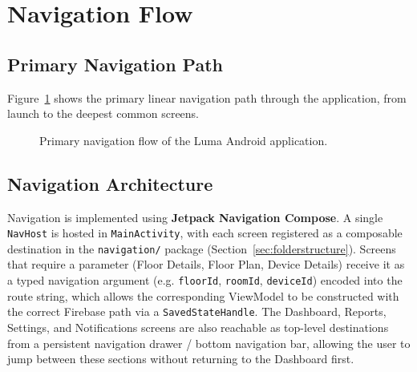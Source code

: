 \documentclass[11pt,a4paper]{article}
\begin{document}
\section{Navigation Flow}
\label{sec:navigation}

\subsection{Primary Navigation Path}
Figure~\ref{fig:nav-flow} shows the primary linear navigation path through the application, from launch to the deepest common screens.

\begin{figure}[H]
\centering
{}
\caption{Primary navigation flow of the Luma Android application.}
\label{fig:nav-flow}
\end{figure}

\subsection{Navigation Architecture}
Navigation is implemented using \textbf{Jetpack Navigation Compose}. A single \texttt{NavHost} is hosted in \texttt{MainActivity}, with each screen registered as a composable destination in the \texttt{navigation/} package (Section~\ref{sec:folderstructure}). Screens that require a parameter (Floor Details, Floor Plan, Device Details) receive it as a typed navigation argument (e.g. \texttt{floorId}, \texttt{roomId}, \texttt{deviceId}) encoded into the route string, which allows the corresponding ViewModel to be constructed with the correct Firebase path via a \texttt{SavedStateHandle}. The Dashboard, Reports, Settings, and Notifications screens are also reachable as top-level destinations from a persistent navigation drawer / bottom navigation bar, allowing the user to jump between these sections without returning to the Dashboard first.
\end{document}
